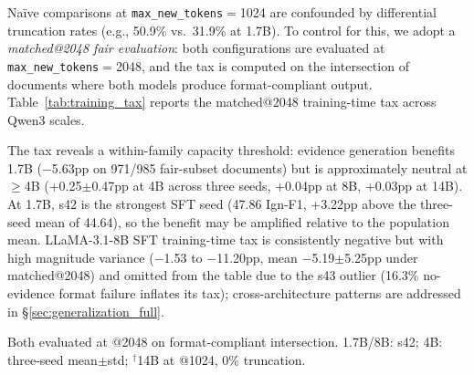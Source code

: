 Na\"ive comparisons at \texttt{max\_new\_tokens}$=$1024 are confounded by differential truncation rates (e.g., 50.9\% vs.\ 31.9\% at 1.7B). To control for this, we adopt a \emph{matched@2048 fair evaluation}: both configurations are evaluated at \texttt{max\_new\_tokens}$=$2048, and the tax is computed on the intersection of documents where both models produce format-compliant output. Table~\ref{tab:training_tax} reports the matched@2048 training-time tax across Qwen3 scales.

The tax reveals a within-family capacity threshold: evidence generation benefits 1.7B ($-$5.63pp on 971/985 fair-subset documents) but is approximately neutral at $\geq$4B (+0.25$\pm$0.47pp at 4B across three seeds, +0.04pp at 8B, +0.03pp at 14B). At 1.7B, s42 is the strongest SFT seed (47.86 Ign-F1, +3.22pp above the three-seed mean of 44.64), so the benefit may be amplified relative to the population mean. LLaMA-3.1-8B SFT training-time tax is consistently negative but with high magnitude variance ($-$1.53 to $-$11.20pp, mean $-$5.19$\pm$5.25pp under matched@2048) and omitted from the table due to the s43 outlier (16.3\% no-evidence format failure inflates its tax); cross-architecture patterns are addressed in \S\ref{sec:generalization_full}.

\begin{table}[t]
\centering
\caption{Training-time evidence tax under matched@2048 fair evaluation (DocRED dev Ign-F1). Tax $=$ no-evi $-$ with-evi; positive $=$ cost.}
\label{tab:training_tax}
\small
{}
\vspace{1mm}
{\raggedright\footnotesize Both evaluated at @2048 on format-compliant intersection. 1.7B/8B: s42; 4B: three-seed mean$\pm$std; $^\dagger$14B at @1024, 0\% truncation.\par}
\end{table}

